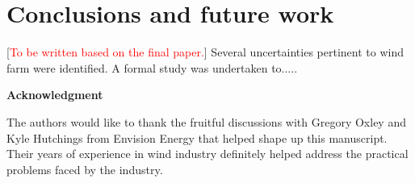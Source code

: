 \documentclass[]{aiaa-tc}%
\begin{document}
\section{Conclusions and future work}
[\textcolor{red}{To be written based on the final paper.}]
Several uncertainties pertinent to wind farm were identified. A formal study was undertaken to.....

\vspace{20px}

\textbf{Acknowledgment}

The authors would like to thank the fruitful discussions with Gregory Oxley and Kyle Hutchings from Envision Energy that helped shape up this manuscript. Their years of experience in wind industry definitely helped address the practical problems faced by the industry.
\end{document}
